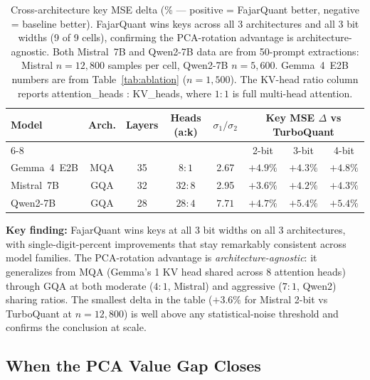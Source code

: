 \documentclass{article}
\begin{document}
\begin{table}[t]
\centering
\small
\caption{Cross-architecture key MSE delta (\% — positive = FajarQuant
better, negative = baseline better). FajarQuant wins keys across all
3 architectures and all 3 bit widths (9 of 9 cells), confirming the
PCA-rotation advantage is architecture-agnostic. Both Mistral~7B and
Qwen2-7B data are from 50-prompt extractions: Mistral $n{=}12{,}800$
samples per cell, Qwen2-7B $n{=}5{,}600$. Gemma~4~E2B numbers are
from Table~\ref{tab:ablation} ($n{=}1{,}500$). The KV-head ratio
column reports attention\_heads : KV\_heads, where $1{:}1$ is full
multi-head attention.}
\label{tab:crossmodel}
\begin{tabular}{lccccccc}
\toprule
\multirow{2}{*}{Model} & \multirow{2}{*}{Arch.} & \multirow{2}{*}{Layers} & \multirow{2}{*}{Heads (a:k)} & \multirow{2}{*}{$\sigma_1/\sigma_2$} & \multicolumn{3}{c}{Key MSE $\Delta$ vs TurboQuant} \\
\cmidrule(lr){6-8}
 & & & & & 2-bit & 3-bit & 4-bit \\
\midrule
Gemma~4~E2B  & MQA      & 35 & $8{:}1$ & 2.67 & $\mathbf{+4.9\%}$ & $\mathbf{+4.3\%}$ & $\mathbf{+4.8\%}$ \\
Mistral~7B   & GQA      & 32 & $32{:}8$ & 2.95 & $\mathbf{+3.6\%}$ & $\mathbf{+4.2\%}$ & $\mathbf{+4.3\%}$ \\
Qwen2-7B     & GQA      & 28 & $28{:}4$ & $\mathbf{7.71}$ & $\mathbf{+4.7\%}$ & $\mathbf{+5.4\%}$ & $\mathbf{+5.4\%}$ \\
\bottomrule
\end{tabular}
\end{table}

\textbf{Key finding:} FajarQuant wins keys at all 3 bit widths on all
3 architectures, with single-digit-percent improvements that stay
remarkably consistent across model families. The PCA-rotation
advantage is \emph{architecture-agnostic}: it generalizes from MQA
(Gemma's 1 KV head shared across 8 attention heads) through GQA at
both moderate ($4{:}1$, Mistral) and aggressive ($7{:}1$, Qwen2)
sharing ratios. The smallest delta in the table ($+3.6\%$ for Mistral
2-bit vs TurboQuant at $n{=}12{,}800$) is well above any
statistical-noise threshold and confirms the conclusion at scale.

\subsection{When the PCA Value Gap Closes}
\label{sec:value-gap-closes}
\end{document}

